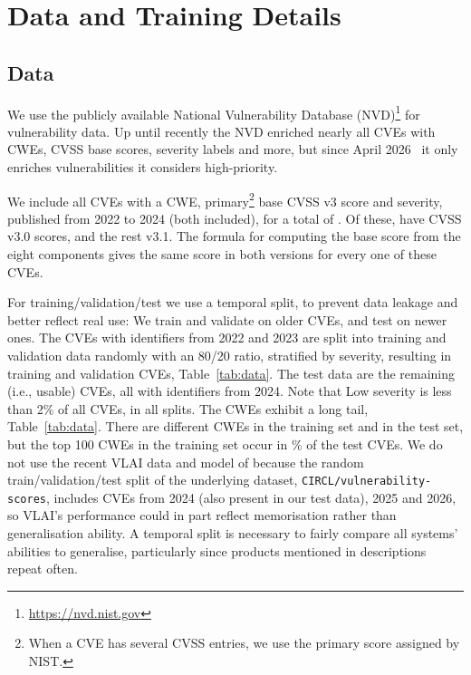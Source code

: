 \FloatBarrier
\section{Data and Training Details}\label{app:data}

\FloatBarrier
\subsection{Data}
We use the publicly available National Vulnerability Database (NVD)\footnote{\url{https://nvd.nist.gov}} for vulnerability data.
Up until recently the NVD enriched nearly all CVEs with CWEs, CVSS base scores, severity labels and more, but since April 2026~\citep{nist2026nvd} it only enriches vulnerabilities it considers high-priority.

We include all CVEs with a CWE, primary\footnote{When a CVE has several CVSS entries, we use the primary score assigned by NIST.} base CVSS v3 score and severity, published from 2022 to 2024 (both included), for a total of \nAll.
Of these, \nVThreeZero{} have CVSS v3.0 scores, and the rest v3.1.
The formula for computing the base score from the eight components gives the same score in both versions for every one of these CVEs.

For training/validation/test we use a temporal split, to prevent data leakage and better reflect real use: We train and validate on older CVEs, and test on newer ones.
The \nTrainVal{} CVEs with identifiers from 2022 and 2023 are split into training and validation data randomly with an 80/20 ratio, stratified by severity, resulting in \nTrain{} training and \nVal{} validation CVEs, Table~\ref{tab:data}.
The test data are the \nTest{} remaining (i.e., usable) CVEs, all with identifiers from 2024.
Note that Low severity is less than 2\% of all CVEs, in all splits.
The CWEs exhibit a long tail, Table~\ref{tab:data}.
There are \nTrainCwes{} different CWEs in the training set and \nTestCwes{} in the test set, but the top 100 CWEs in the training set occur in \nTopCov\% of the test CVEs.
We do not use the recent VLAI data and model of \citet{bonhomme2025vlai} because the random train/validation/test split of the underlying dataset, \texttt{CIRCL/vulnerability-scores}, includes CVEs from 2024 (also present in our test data), 2025 and 2026, so VLAI's performance could in part reflect memorisation rather than generalisation ability.
A temporal split is necessary to fairly compare all systems' abilities to generalise, particularly since products mentioned in descriptions repeat often.

